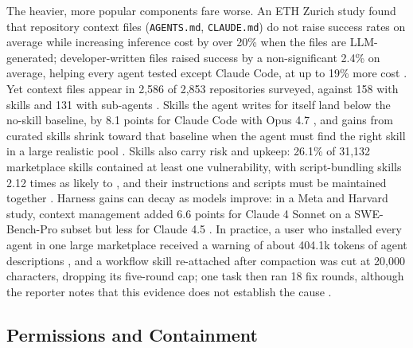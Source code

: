 The heavier, more popular components fare worse. An ETH Zurich study found that repository context files (\texttt{AGENTS.md}, \texttt{CLAUDE.md}) do not raise success rates on average while increasing inference cost by over 20\% when the files are LLM-generated; developer-written files raised success by a non-significant 2.4\% on average, helping every agent tested except Claude Code, at up to 19\% more cost \citep{H1}. Yet context files appear in 2,586 of 2,853 repositories surveyed, against 158 with skills and 131 with sub-agents \citep{H2}. Skills the agent writes for itself land below the no-skill baseline, by 8.1 points for Claude Code with Opus 4.7 \citep{H6}, and gains from curated skills shrink toward that baseline when the agent must find the right skill in a large realistic pool \citep{H7}. Skills also carry risk and upkeep: 26.1\% of 31,132 marketplace skills contained at least one vulnerability, with script-bundling skills 2.12 times as likely to \citep{H22}, and their instructions and scripts must be maintained together \citep{H12}. Harness gains can decay as models improve: in a Meta and Harvard study, context management added 6.6 points for Claude 4 Sonnet on a SWE-Bench-Pro subset but less for Claude 4.5 \citep{H20}. In practice, a user who installed every agent in one large marketplace received a warning of about 404.1k tokens of agent descriptions , and a workflow skill re-attached after compaction was cut at 20,000 characters, dropping its five-round cap; one task then ran 18 fix rounds, although the reporter notes that this evidence does not establish the cause .

\subsection{Permissions and Containment}

